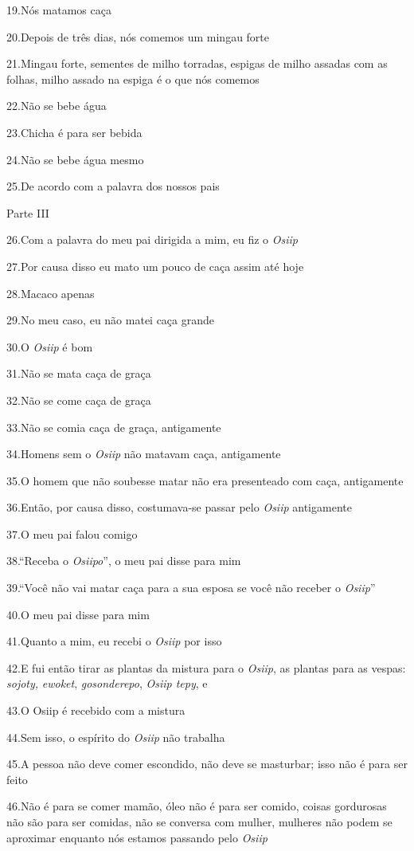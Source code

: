19.Nós matamos caça

20.Depois de três dias, nós comemos um mingau forte

21.Mingau forte, sementes de milho torradas, espigas de milho assadas
com as folhas, milho assado na espiga é o que nós comemos

22.Não se bebe água

23.Chicha é para ser bebida

24.Não se bebe água mesmo

25.De acordo com a palavra dos nossos pais

Parte III

26.Com a palavra do meu pai dirigida a mim, eu fiz o \emph{Osiip}

27.Por causa disso eu mato um pouco de caça assim até hoje

28.Macaco apenas

29.No meu caso, eu não matei caça grande

30.O \emph{Osiip} é bom

31.Não se mata caça de graça

32.Não se come caça de graça

33.Não se comia caça de graça, antigamente

34.Homens sem o \emph{Osiip} não matavam caça, antigamente

35.O homem que não soubesse matar não era presenteado com caça,
antigamente

36.Então, por causa disso, costumava-se passar pelo \emph{Osiip}
antigamente

37.O meu pai falou comigo

38.``Receba o \emph{Osiipo}'', o meu pai disse para mim

39.``Você não vai matar caça para a sua esposa se você não receber o
\emph{Osiip}''

40.O meu pai disse para mim

41.Quanto a mim, eu recebi o \emph{Osiip} por isso

42.E fui então tirar as plantas da mistura para o \emph{Osiip}, as
plantas para as vespas: \emph{sojoty,} \emph{ewoket},
\emph{gosonderepo}, \emph{Osiip tepy}, e

43.O Osiip é recebido com a mistura

44.Sem isso, o espírito do \emph{Osiip} não trabalha

45.A pessoa não deve comer escondido, não deve se masturbar; isso não é
para ser feito

46.Não é para se comer mamão, óleo não é para ser comido, coisas
gordurosas não são para ser comidas, não se conversa com mulher,
mulheres não podem se aproximar enquanto nós estamos passando pelo
\emph{Osiip}

